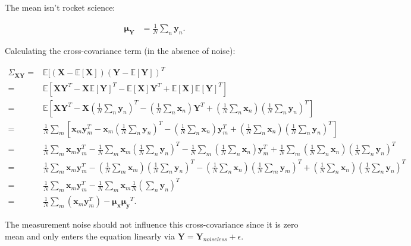 The mean isn't rocket science:

\begin{align}
\mathbf{\mu_{Y}} & =\frac{1}{N}\sum_{n}\mathbf{y}_{n}.
\end{align}


Calculating the cross-covariance term (in the absence of noise):

\begin{align}
\Sigma_{\mathbf{XY}}= & \mathbb{E}[(\mathbf{X}-\mathbb{E}[\mathbf{X}])(\mathbf{Y}-\mathbb{E}[\mathbf{Y}])^{T}\nonumber \\
= & \mathbb{E}\left[\mathbf{X}\mathbf{Y}^{T}-\mathbf{X}\mathbb{E}[\mathbf{Y}]^{T}-\mathbb{E}[\mathbf{X}]\mathbf{Y}^{T}+\mathbb{E}[\mathbf{X}]\mathbb{E}[\mathbf{Y}]^{T}\right]\nonumber \\
= & \mathbb{E}\left[\mathbf{X}\mathbf{Y}^{T}-\mathbf{X}(\frac{1}{N}\sum_{n}\mathbf{y}_{n})^{T}-(\frac{1}{N}\sum_{n}\mathbf{x}_{n})\mathbf{Y}^{T}+(\frac{1}{N}\sum_{n}\mathbf{x}_{n})(\frac{1}{N}\sum_{n}\mathbf{y}_{n})^{T}\right]\nonumber \\
= & \frac{1}{N}\sum_{m}\left[\mathbf{x}_{m}\mathbf{y}_{m}^{T}-\mathbf{x}_{m}(\frac{1}{N}\sum_{n}\mathbf{y}_{n})^{T}-(\frac{1}{N}\sum_{n}\mathbf{x}_{n})\mathbf{y}_{m}^{T}+(\frac{1}{N}\sum_{n}\mathbf{x}_{n})(\frac{1}{N}\sum_{n}\mathbf{y}_{n})^{T}\right]\nonumber \\
= & \frac{1}{N}\sum_{m}\mathbf{x}_{m}\mathbf{y}_{m}^{T}-\frac{1}{N}\sum_{m}\mathbf{x}_{m}(\frac{1}{N}\sum_{n}\mathbf{y}_{n})^{T}-\frac{1}{N}\sum_{m}(\frac{1}{N}\sum_{n}\mathbf{x}_{n})\mathbf{y}_{m}^{T}+\frac{1}{N}\sum_{m}(\frac{1}{N}\sum_{n}\mathbf{x}_{n})(\frac{1}{N}\sum_{n}\mathbf{y}_{n})^{T}\nonumber \\
= & \frac{1}{N}\sum_{m}\mathbf{x}_{m}\mathbf{y}_{m}^{T}-(\frac{1}{N}\sum_{m}\mathbf{x}_{m})(\frac{1}{N}\sum_{n}\mathbf{y}_{n})^{T}-(\frac{1}{N}\sum_{n}\mathbf{x}_{n})(\frac{1}{N}\sum_{m}\mathbf{y}_{m})^{T}+(\frac{1}{N}\sum_{n}\mathbf{x}_{n})(\frac{1}{N}\sum_{n}\mathbf{y}_{n})^{T}\nonumber \\
= & \frac{1}{N}\sum_{m}\mathbf{x}_{m}\mathbf{y}_{m}^{T}-\frac{1}{N}\sum_{m}\mathbf{x}_{m}\frac{1}{N}(\sum_{n}\mathbf{y}_{n})^{T}\nonumber \\
= & \frac{1}{N}\sum_{m}(\mathbf{x}_{m}\mathbf{y}_{m}^{T})-\mathbf{\mu_{x}}\mathbf{\mu_{y}}^{T}.
\end{align}


The measurement noise should not influence this cross-covariance since
it is zero mean and only enters the equation linearly via $\mathbf{Y}=\mathbf{Y}_{{noiseless}}+\epsilon$.


